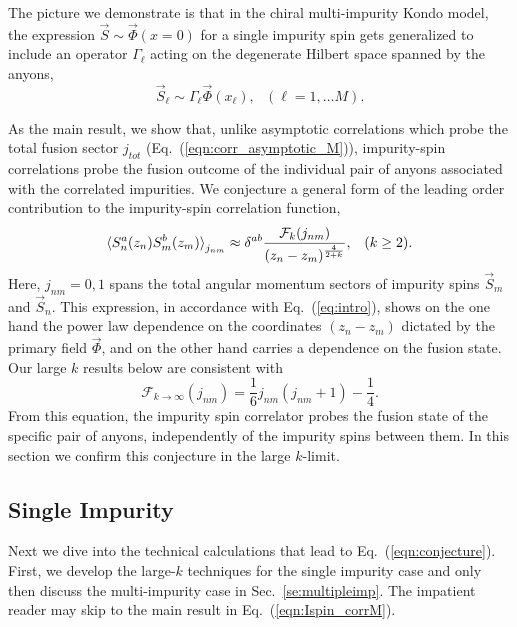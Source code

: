 \documentclass[aps,prb,twocolumn,superscriptaddress]{revtex4-1}
\newcommand{\be}{\begin{equation}}
\newcommand{\ee}{\end{equation}}
\begin{document}
The picture we demonstrate is that in the chiral multi-impurity Kondo model, the expression $\vec{S} \sim \vec{\Phi}(x=0)$ for a single impurity spin gets generalized to include an operator $\Gamma_{\ell}$ acting on the degenerate Hilbert space spanned by the anyons,
\be
\label{eq:intro}
\vec{S}_{\ell} \sim  \Gamma_{\ell} \vec{\Phi}(x_{\ell}),~~~({\ell}=1,\dots M).
\ee

As the main result, we show that, unlike asymptotic correlations which probe the total fusion sector $j_{tot}$ (Eq.~(\ref{eqn:corr_asymptotic_M})), impurity-spin correlations  probe the fusion outcome of the individual pair of anyons associated with the correlated impurities. We conjecture a general form of the leading order contribution to the impurity-spin correlation function, 
\begin{eqnarray}
\braket{S^{a}_{n}(z_{n})S^{b}_{m}(z_{m})}_{j_{nm}} \approx \delta^{ab}\frac{\mathcal{F}_k(j_{nm})}{(z_{n}-z_{m})^{\frac{4}{2+k}}},\;\;\;(k\ge 2). \nonumber \\ \label{eqn:conjecture}
\end{eqnarray}
Here, $j_{nm}=0,1$ spans the total angular momentum sectors of impurity spins $\vec{S}_{m}$ and $\vec{S}_{n}$. This expression, in accordance with Eq.~(\ref{eq:intro}), shows on the one hand the power law dependence on the coordinates $(z_{n}-z_{m})$ dictated by the primary field $\vec{\Phi}$, and on the other hand carries a dependence on the fusion state. Our large $k$ results below are consistent with
\be
\mathcal{F}_{k \to \infty}(j_{nm}) = \frac{1}{6}j_{nm}(j_{nm}+1)-\frac{1}{4}.
\ee
From this equation, the impurity spin correlator probes the fusion state of the specific pair of anyons, independently of the impurity spins between them. In this section we confirm this conjecture in the large $k$-limit. 


\subsection{Single Impurity}
Next we dive into the technical calculations that lead to Eq.~(\ref{eqn:conjecture}). First, we develop the large-$k$ techniques for the single impurity case and only then discuss the multi-impurity case in Sec.~\ref{se:multipleimp}. The impatient reader may skip to the main result in Eq.~(\ref{eqn:Ispin_corrM}).
\end{document}

